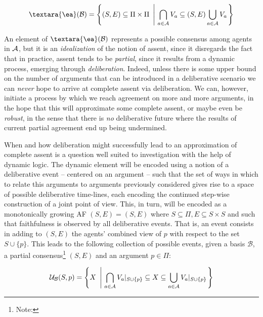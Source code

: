 \documentclass{llncs}
\newcommand{\update}[3]{{\mathcal U}_{#1}(#2,#3)}
\newcommand{\cons}[1]{{\textara{\ea}}(#1)}
\newcommand{\af}{(S, E)}
\newcommand{\views}{\mathcal B}
\begin{document}
\begin{equation}\label{def:consensus}
\cons \views = \left\{\af \subseteq \Pi \times \Pi ~\left|~ \bigcap_{a \in \agents}V_a \subseteq \af \bigcup_{a \in \agents}V_a \right.\right\}
\end{equation}

An element of $\cons \views$ represents a possible consensus among agents in $\mathcal A$, but it is an \emph{idealization} of the notion of assent, since it disregards the fact that in practice, assent tends to be \emph{partial}, since it results from a dynamic process, emerging through \emph{deliberation}. Indeed, unless there is some upper bound on the number of arguments that can be introduced in a deliberative scenario we can \emph{never} hope to arrive at complete assent via deliberation. We can, however, initiate a process by which we reach agreement on more and more arguments, in the hope that this will approximate some complete assent, or maybe even be \emph{robust}, in the sense that there is \emph{no} deliberative future where the results of current partial agreement end up being undermined.

When and how deliberation might successfully lead to an approximation of complete assent is a question well suited to investigation with the help of dynamic logic. The dynamic element will be encoded using a notion of a deliberative event -- centered on an argument -- such that the set of ways in which to relate this arguments to arguments previously considered gives rise to a space of possible deliberative time-lines, each encoding the continued step-wise construction of a joint point of view. This, in turn, will be encoded as a monotonically growing AF $\af = (S,E)$ where $S \subseteq \Pi, E \subseteq S \times S$ and such that faithfulness is observed by all deliberative events. That is, an event consists in adding to $\af$ the agents' combined view of $p$ with respect to the set $S \cup \{p\}$. This leads to the following collection of possible events, given a basis $\views$, a partial consensus\footnote{Note: } $(S,E)$ and an argument $p \in \Pi$:

\begin{equation}\label{eq:update}
\update \views S p = \left\{X ~\left|~ \bigcap_{a \in \agents}\restr {V_a} {S \cup \{p\}} \subseteq X \subseteq \bigcup_{a \in \agents}\restr {V_a}{S \cup \{p\}}\right.\right\}
\end{equation}
\end{document}
